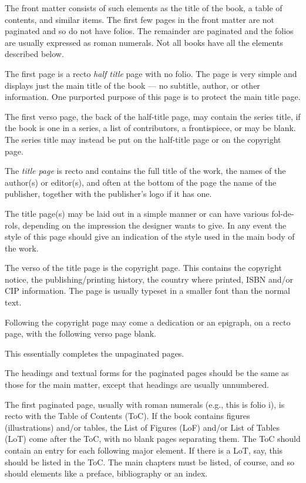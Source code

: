 \documentclass[10pt,letterpaper]{memoir}
\newcommand{\prtoc}{ToC}             %
\newcommand{\prlof}{LoF}
\newcommand{\prlot}{LoT}
\newcommand{\ixtoc}{\index{ToC}}     %
\newcommand{\toc}{\prtoc\ixtoc}      %
\newcommand{\lof}{\prlof\index{LoF}}
\newcommand{\lot}{\prlot\index{LoT}}
\begin{document}
    The front matter consists of such elements as the title
of the book, a table of contents\ixtoc, and similar items. The first few pages
in the front matter are not paginated and so do not have folios. The remainder
are paginated and the folios are usually expressed as roman numerals. Not all
books have all the elements described below.

    The first page is a recto \emph{half title} 
page with no folio. 
The page is very simple and displays just the main title of the book --- 
no subtitle, author, or other information. One purported purpose of this
page is to protect the main title page.

    The first verso page, the back of the half-title page, may contain the 
series title, if the book is one in a series, a list of contributors, 
a frontispiece, or may be blank. The series title may instead be put on the 
half-title page or on the copyright page.

   The \emph{title page} is recto and contains the full 
title of the work, the names of the author(s) or editor(s), and often at the
bottom of the page the name of the publisher, together with the publisher's 
logo if it has one.

    The title page(s) may be laid out in a simple manner or can have various
fol-de-rols, depending on the impression the designer wants to give. In
any event the style of this page should give an indication of the style
used in the main body of the work.

    The verso of the title page is the copyright page.
This contains the copyright notice, the publishing/printing history, 
the country where printed, ISBN and/or CIP information. The page is usually 
typeset in a smaller font than the normal text.

    Following the copyright page may come a dedication or an epigraph, 
on a recto page, with the following verso page blank.

    This essentially completes the unpaginated pages.

    The headings and textual forms for the paginated 
pages should be the same as those for the main matter, except that 
headings are usually unnumbered.

    The first paginated page,
usually with roman numerals (e.g., this is folio i),
is recto with the Table of Contents (\toc). If the book contains 
figures (illustrations) 
and/or tables, the List of Figures (\lof) and/or List of Tables (\lot) come 
after the \toc, with no blank pages separating them. The \toc{} should contain
an entry for each following major element. If there is a \lot, say, this 
should be listed in the \toc. The main chapters must be listed, of course, and
so should elements like a preface, bibliography or an index.
\end{document}
